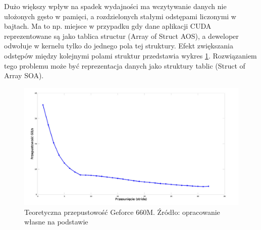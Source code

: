 Dużo większy wpływ na spadek wydajności ma wczytywanie danych nie ułożonych gęsto w
pamięci, a rozdzielonych stałymi odstępami liczonymi w bajtach. Ma to np. miejsce w przypadku gdy
dane aplikacji CUDA reprezentowane są jako tablica structur (Array of Struct AOS), a deweloper
odwołuje w kernelu tylko do jednego pola tej struktury. Efekt zwiększania odstępów
między kolejnymi polami struktur przedstawia wykres \ref{hier}. Rozwiązaniem tego
problemu może być reprezentacja danych jako struktury tablic (Struct of Array
		SOA).

\begin{figure}[H]
\centering
\includegraphics[scale=0.4]{images/gf660_stride.png}
\caption{Teoretyczna przepustowość Geforce 660M. Źródło: opracowanie własne na
	podstawie \cite{memperf}}
\label{hier}
\end{figure}
